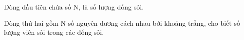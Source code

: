 Dòng đầu tiên chứa số N, là số lượng đống sỏi.  

   Dòng thứ hai gồm N số nguyên dương cách nhau bởi khoảng trắng, cho biết số lượng viên sỏi trong các đống sỏi.
